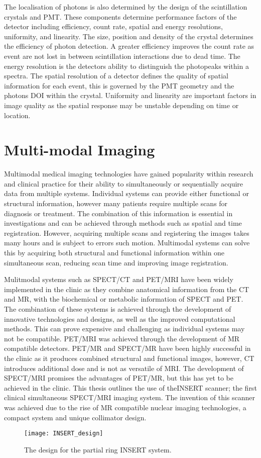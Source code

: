 The localisation of photons is also determined by the design of the scintillation crystals and \acrshort{PMT}. These components determine performance factors of the detector including efficiency, count rate, spatial and energy resolutions, uniformity, and linearity. The size, position and density of the crystal determines the efficiency of photon detection. A greater efficiency improves the count rate as event are not lost in between scintillation interactions due to dead time. The energy resolution is the detectors ability to distinguish the photopeaks within a spectra. The spatial resolution of a detector defines the quality of spatial information for each event, this is governed by the \acrshort{PMT} geometry and the photons \acrlong{DOI} within the crystal. Uniformity and linearity are important factors in image quality as the spatial response may be unstable depending on time or location.
\section{Multi-modal Imaging} %
Multimodal medical imaging technologies have gained popularity within research and clinical practice for their ability to simultaneously or sequentially acquire data from multiple systems. Individual systems can provide either functional or structural information, however many patients require multiple scans for diagnosis or treatment. The combination of this information is essential in investigations and can be achieved through methods such as spatial and time registration. However, acquiring multiple scans and registering the images takes many hours and is subject to errors such motion. Multimodal systems can solve this by acquiring both structural and functional information within one simultaneous scan, reducing scan time and improving image registration. 

Mulitmodal systems such as \acrlong{SPECT/CT} and \acrlong{PET/MRI} have been widely implemented in the clinic as they combine anatomical information from the \acrshort{CT} and \acrshort{MR}, with the biochemical or metabolic information of \acrshort{SPECT} and \acrshort{PET}. The combination of these systems is achieved through the development of innovative technologies and designs, as well as the improved computational methods. This can prove expensive and challenging as individual systems may not be compatible. \acrshort{PET/MRI} was achieved through the development of \acrshort{MR} compatible detectors. \acrshort{PET/MR} and \acrshort{SPECT/MR} have been highly successful in the clinic as it produces combined structural and functional images, however, \acrshort{CT} introduces additional dose and is not as versatile of \acrshort{MRI}. The development of \acrshort{SPECT/MRI} promises the advantages of \acrshort{PET/MR}, but this has yet to be achieved in the clinic. This thesis outlines the use of the\acrshort{INSERT} scanner; the first clinical simultaneous \acrshort{SPECT/MRI} imaging system. The invention of this scanner was achieved due to the rise of \acrshort{MR} compatible nuclear imaging technologies, a compact system and unique collimator design. 

\begin{figure}[htp]
    \centering
    \texttt{[image: INSERT\_design]} %
    \caption{The design for the partial ring INSERT system.} \label{fig:INSERT}
\end{figure}


